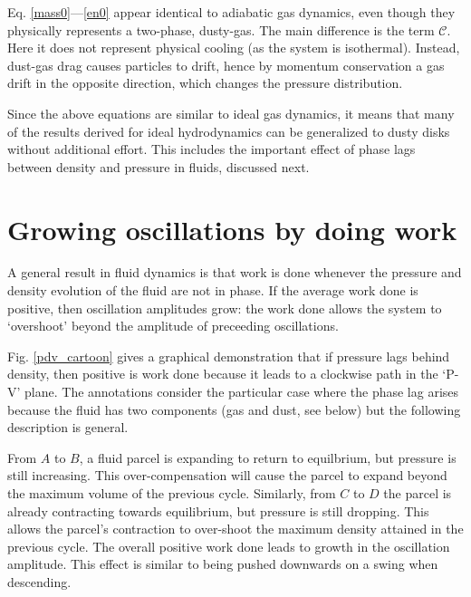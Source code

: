\documentclass[iop, numberedappendix]{emulateapj}
\begin{document}
Eq. \ref{mass0}---\ref{en0} appear identical to adiabatic gas dynamics, even  
though they physically represents a two-phase, dusty-gas. The main
difference is the term $\mathcal{C}$. Here it does not represent
physical cooling (as the system is isothermal). Instead, dust-gas drag
causes particles to drift, hence by momentum conservation a gas drift
in the opposite direction, which changes the pressure distribution.   

Since the above equations are similar to ideal gas dynamics, it 
means that many of the results derived for ideal hydrodynamics can be  
generalized to dusty disks without additional effort. This includes 
the important effect of phase lags between density and pressure in
fluids, discussed next. 

\section{Growing oscillations by doing work}\label{grow_osc}
A general result in fluid dynamics is that work is done whenever the
pressure and density evolution of the fluid are not in phase. If 
the average work done is positive, then oscillation amplitudes 
grow: the work done allows the system to `overshoot' beyond
the amplitude of preceeding oscillations. 


Fig. \ref{pdv_cartoon} gives a graphical demonstration that 
if pressure lags behind density, then positive is work done 
because it leads to a clockwise path in the 
`P-V' plane. The annotations consider the particular case where the
phase lag arises because the fluid has two components (gas and dust,
see below) but the following description is general. 

From $A$ to $B$, a fluid parcel is expanding to return to 
equilbrium, but pressure is still 
increasing. This over-compensation will cause the parcel to expand
beyond the maximum volume of the previous cycle. 
Similarly, from $C$ to $D$ the parcel is already contracting towards
equilibrium, but pressure 
is still dropping. This allows the  
parcel's contraction to over-shoot the maximum density attained in the
previous cycle. 
The overall positive work done leads to growth in the oscillation amplitude. 
This effect is similar to being pushed downwards on a swing when 
descending.
\end{document}
